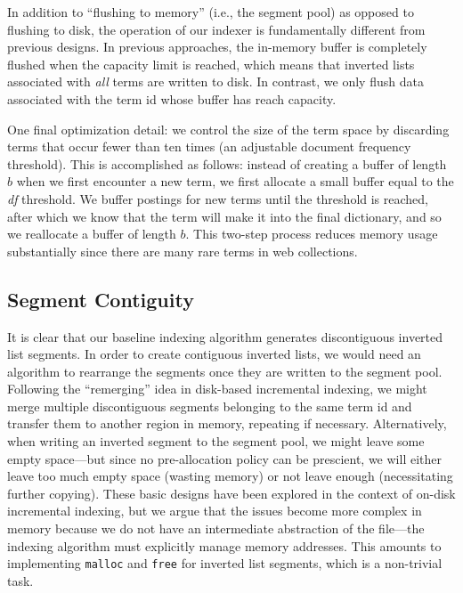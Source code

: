 In addition to ``flushing to memory'' (i.e., the segment pool) as opposed to flushing to disk, the operation of our indexer is fundamentally different from previous designs. In previous approaches, the in-memory buffer is completely flushed when the capacity limit is reached, which means that inverted lists associated with \textit{all} terms are written to disk. In contrast, we only flush data associated with the term id whose buffer has reach capacity.

One final optimization detail: we control the size of the term space by discarding terms that occur fewer than ten times (an adjustable document frequency threshold). This is accomplished as follows: instead of creating a buffer of length $b$ when we first encounter a new term, we first allocate a small buffer equal to the \textit{df} threshold. We buffer postings for new terms until the threshold is reached, after which we know that the term will make it into the final dictionary, and so we reallocate a buffer of length $b$. This two-step process reduces memory usage substantially since there are many rare terms in web collections.

\subsection{Segment Contiguity}
\label{section:algo:contiguity}

It is clear that our baseline indexing algorithm generates discontiguous inverted list segments. In order to create contiguous inverted lists, we would need an algorithm to rearrange the segments once they are written to the segment pool. Following the ``remerging'' idea in disk-based incremental indexing, we might merge multiple discontiguous segments belonging to the same term id and transfer them to another region in memory, repeating if necessary. Alternatively, when writing an inverted segment to the segment pool, we might leave some empty space---but since no pre-allocation policy can be prescient, we will either leave too much empty space (wasting memory) or not leave enough (necessitating further copying). These basic designs have been explored in the context of on-disk incremental indexing, but we argue that the issues become more complex in memory because we do not have an intermediate abstraction of the file---the indexing algorithm must explicitly manage memory addresses. This amounts to 
implementing \texttt{malloc} and \texttt{free} for inverted list segments, which is a non-trivial task.

